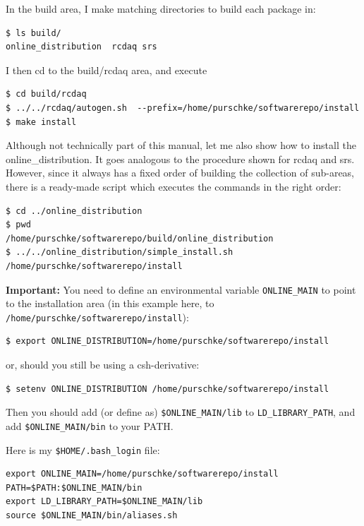 \documentclass{article}[11pt]
\begin{document}
In the build area, I make matching directories to build each package in:

\begin{verbatim} 
$ ls build/
online_distribution  rcdaq srs
\end{verbatim}

I then cd to the build/rcdaq area, and execute 

\begin{verbatim} 
$ cd build/rcdaq
$ ../../rcdaq/autogen.sh  --prefix=/home/purschke/softwarerepo/install
$ make install
\end{verbatim}

Although not technically part of this manual, let me also show how to install
the online\_distribution. It goes analogous to the procedure shown for rcdaq and srs. 
However, since it always has a fixed order of building the collection of sub-areas, there is a 
ready-made script which executes the commands in the right order:

\begin{verbatim} 
$ cd ../online_distribution
$ pwd
/home/purschke/softwarerepo/build/online_distribution
$ ../../online_distribution/simple_install.sh /home/purschke/softwarerepo/install
\end{verbatim}
 
{\bf Important:} You need to define an environmental variable
\verb|ONLINE_MAIN| to point to the installation area (in this example
here, to \verb|/home/purschke/softwarerepo/install|):

\begin{verbatim} 
$ export ONLINE_DISTRIBUTION=/home/purschke/softwarerepo/install
\end{verbatim}

or, should you still be using a csh-derivative:

\begin{verbatim} 
$ setenv ONLINE_DISTRIBUTION /home/purschke/softwarerepo/install
\end{verbatim}

Then you should add (or define as) \verb|$ONLINE_MAIN/lib| to
\verb|LD_LIBRARY_PATH|, and add \verb|$ONLINE_MAIN/bin| to your PATH.

Here is my \verb|$HOME/.bash_login| file:

\begin{verbatim} 
export ONLINE_MAIN=/home/purschke/softwarerepo/install
PATH=$PATH:$ONLINE_MAIN/bin
export LD_LIBRARY_PATH=$ONLINE_MAIN/lib
source $ONLINE_MAIN/bin/aliases.sh
\end{verbatim}
\end{document}
